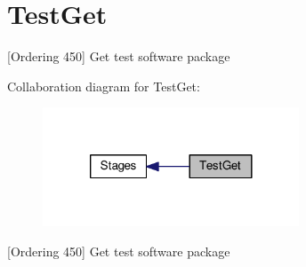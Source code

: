 \hypertarget{group__TestGet}{\section{Test\-Get}
\label{group__TestGet}
}


\mbox{[}Ordering 450\mbox{]} Get test software package  


Collaboration diagram for Test\-Get\-:
\nopagebreak
\begin{figure}[H]
\begin{center}
\leavevmode
\includegraphics[width=216pt]{group__TestGet}
\end{center}
\end{figure}
\mbox{[}Ordering 450\mbox{]} Get test software package 
